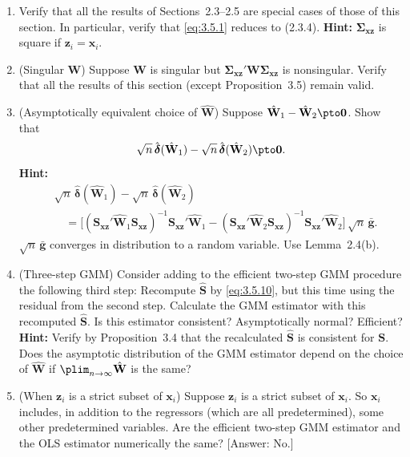 \begin{enumerate}
\item Verify that all the results of Sections~2.3--2.5 are special cases of those of this
  section.  In particular, verify that \eqref{eq:3.5.1} reduces to (2.3.4).
  \textbf{Hint:} $\boldsymbol{\Sigma}_{\mathbf{xz}}$ is square if $\mathbf{z}_i = \mathbf{x}_i$.

\item (Singular $\mathbf{W}$) \; Suppose $\mathbf{W}$ is singular but
  $\boldsymbol{\Sigma}_{\mathbf{xz}}' \mathbf{W} \boldsymbol{\Sigma}_{\mathbf{xz}}$ is nonsingular.
  Verify that all the results of this section (except Proposition~3.5) remain valid.

\item (Asymptotically equivalent choice of $\hat{\mathbf{W}}$) \; Suppose
  $\hat{\mathbf{W}}_1 - \hat{\mathbf{W}}_2 \pto \mathbf{0}$.  Show that
  \[
    \sqrt{n}\,\hat{\boldsymbol{\delta}}(\hat{\mathbf{W}}_1)
    - \sqrt{n}\,\hat{\boldsymbol{\delta}}(\hat{\mathbf{W}}_2) \pto \mathbf{0}.
  \]
  \textbf{Hint:}
  \begin{align*}
    &\sqrt{n}\,\hat{\boldsymbol{\delta}}(\hat{\mathbf{W}}_1)
    - \sqrt{n}\,\hat{\boldsymbol{\delta}}(\hat{\mathbf{W}}_2) \\
    &\quad = \bigl[(\mathbf{S}_{\mathbf{xz}}' \hat{\mathbf{W}}_1 \mathbf{S}_{\mathbf{xz}})^{-1}
      \mathbf{S}_{\mathbf{xz}}' \hat{\mathbf{W}}_1
      - (\mathbf{S}_{\mathbf{xz}}' \hat{\mathbf{W}}_2 \mathbf{S}_{\mathbf{xz}})^{-1}
      \mathbf{S}_{\mathbf{xz}}' \hat{\mathbf{W}}_2\bigr]\, \sqrt{n}\, \bar{\mathbf{g}}.
  \end{align*}
  $\sqrt{n}\, \bar{\mathbf{g}}$ converges in distribution to a random variable.
  Use Lemma~2.4(b).

\item (Three-step GMM) \; Consider adding to the efficient two-step GMM procedure
  the following third step: Recompute $\hat{\mathbf{S}}$ by \eqref{eq:3.5.10}, but this time using
  the residual from the second step.  Calculate the GMM estimator with this
  recomputed $\hat{\mathbf{S}}$.  Is this estimator consistent?  Asymptotically normal?  Efficient?
  \textbf{Hint:} Verify by Proposition~3.4 that the recalculated $\hat{\mathbf{S}}$ is consistent for
  $\mathbf{S}$.  Does the asymptotic distribution of the GMM estimator depend on the choice of
  $\hat{\mathbf{W}}$ if $\plim_{n\to\infty} \hat{\mathbf{W}}$ is the same?

\item (When $\mathbf{z}_i$ is a strict subset of $\mathbf{x}_i$) \; Suppose $\mathbf{z}_i$
  is a strict subset of $\mathbf{x}_i$.  So $\mathbf{x}_i$ includes, in addition to the regressors
  (which are all predetermined), some other predetermined variables.  Are the efficient
  two-step GMM estimator and the OLS estimator numerically the same?
  [Answer: No.]


\end{enumerate}
